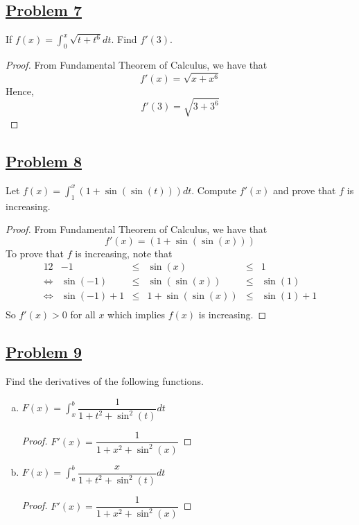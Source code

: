 \documentclass[10pt,letterpaper]{article}
\begin{document}
	\subsection*{{\color{purple}\underline{Problem 7}}}
	If $f(x) = \displaystyle\int_0^x \sqrt{t + t^6} dt$. Find $f'(3)$.
	\begin{proof}
		From Fundamental Theorem of Calculus, we have that
		$$f'(x) = \sqrt{x + x^6}$$
		Hence,
		$$f'(3) = \sqrt{3 + 3^6}$$
	\end{proof}
	
	\subsection*{{\color{purple}\underline{Problem 8}}}
	Let $f(x) = \displaystyle\int_1^x (1 + \sin(\sin(t))) dt$. Compute $f'(x)$ and
	prove that $f$ is increasing.
	\begin{proof}
	From Fundamental Theorem of Calculus, we have that
	$$f'(x) = (1 + \sin(\sin(x)))$$
	To prove that $f$ is increasing, note that
	\begin{alignat*}{12}
	            &	-1     & \leq &        \sin(x) &  \leq & 1 \\
\Leftrightarrow & \sin(-1) & \leq &  \sin(\sin(x)) &  \leq & \sin(1) \\
\Leftrightarrow & \sin(-1) + 1 & \leq & 1 + \sin(\sin(x)) &  \leq & \sin(1) + 1 \\
	\end{alignat*}	 
	So $f'(x) > 0$ for all $x$ which implies $f(x)$ is increasing.
	
	\end{proof}
	
	
	\subsection*{{\color{purple}\underline{Problem 9}}}
	Find the derivatives of the following functions. 
	\begin{enumerate}[(a)]
\item $F(x) = \displaystyle\int_x^b \dfrac{1}{1 + t^2 + \sin^2(t)} dt$
\begin{proof}
	$F'(x) = \dfrac{1}{1 + x^2 + \sin^2(x)}$
\end{proof}

\item $F(x) = \displaystyle\int_a^b \dfrac{x}{1 + t^2 + \sin^2(t)} dt$ 
\begin{proof}
	$F'(x) = \dfrac{1}{1 + x^2 + \sin^2(x)}$
\end{proof}

	\end{enumerate}
	
\end{document}
